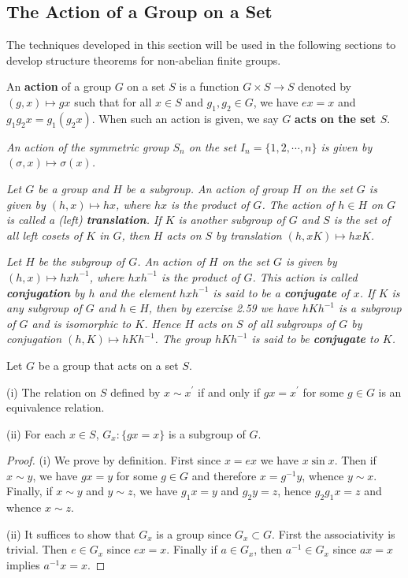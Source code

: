 \subsection{The Action of a Group on a Set}
The techniques developed in this section will be used in the following sections to develop structure theorems for non-abelian finite groups.
\begin{definition}
An \textbf{action} of a group $G$ on a set $S$ is a function $G\times S\to S$ denoted by $(g,x)\mapsto gx$ such that for all $x\in S$ and $g_1,g_2\in G$, we have $ex=x$ and $g_1g_2x=g_1(g_2x)$. When such an action is given, we say $G$ \textbf{acts on the set $S$}.
\end{definition}
\begin{example}\em
An action of the symmetric group $S_n$ on the set $I_n=\{1,2,\cdots,n\}$ is given by $(\sigma,x)\mapsto\sigma(x)$.
\end{example}
\begin{example}\em
Let $G$ be a group and $H$ be a subgroup. An action of group $H$ on the set $G$ is given by $(h,x)\mapsto hx$, where $hx$ is the product of $G$. The action of $h\in H$ on $G$ is called a (left) \textbf{translation}. If $K$ is another subgroup of $G$ and $S$ is the set of all left cosets of $K$ in $G$, then $H$ acts on $S$ by translation $(h,xK)\mapsto hxK$.
\end{example}
\begin{example}\em
Let $H$ be the subgroup of $G$. An action of $H$ on the set $G$ is given by $(h,x)\mapsto hxh^{-1}$, where $hxh^{-1}$ is the product of $G$. This action is called \textbf{conjugation} by $h$ and the element $hxh^{-1}$ is said to be a \textbf{conjugate} of $x$. If $K$ is any subgroup of $G$ and $h\in H$, then by exercise 2.59 we have $hKh^{-1}$ is a subgroup of $G$ and is isomorphic to $K$. Hence $H$ acts on $S$ of all subgroups of $G$ by conjugation $(h,K)\mapsto hKh^{-1}$. The group $hKh^{-1}$ is said to be \textbf{conjugate} to $K$.
\end{example}
\begin{theorem}
Let $G$ be a group that acts on a set $S$.\par
(i) The relation on $S$ defined by $x\sim x^\prime$ if and only if $gx=x^\prime$ for some $g\in G$ is an equivalence relation.\par
(ii) For each $x\in S$, $G_x:\{gx=x\}$ is a subgroup of $G$.
\end{theorem}
\begin{proof}
(i) We prove by definition. First since $x=ex$ we have $x\sin x$. Then if $x\sim y$, we have $gx=y$ for some $g\in G$ and therefore $x=g^{-1}y$, whence $y\sim x$. Finally, if $x\sim y$ and $y\sim z$, we have $g_1x=y$ and $g_2y=z$, hence $g_2g_1x=z$ and whence $x\sim z$.\par
(ii) It suffices to show that $G_x$ is a group since $G_x\subset G$. First the associativity is trivial. Then $e\in G_x$ since $ex=x$. Finally if $a\in G_x$, then $a^{-1}\in G_x$ since $ax=x$ implies $a^{-1}x=x$.
\end{proof}
